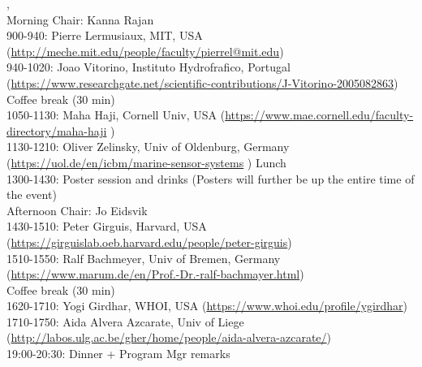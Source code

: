 \newpage
{}

\vspace{3mm}

, \\
Morning Chair: Kanna Rajan\\
900-940: Pierre Lermusiaux, MIT, USA (\url{http://meche.mit.edu/people/faculty/pierrel@mit.edu})\\
940-1020: Joao Vitorino, Instituto Hydrofrafico, Portugal (\url{https://www.researchgate.net/scientific-contributions/J-Vitorino-2005082863})\\
Coffee break (30 min)\\
1050-1130: Maha Haji, Cornell Univ, USA (\url{https://www.mae.cornell.edu/faculty-directory/maha-haji} )\\
1130-1210: Oliver Zelinsky, Univ of Oldenburg, Germany (\url{https://uol.de/en/icbm/marine-sensor-systems} )
Lunch \\
1300-1430: Poster session and drinks (Posters will further be up the entire time of the event) \\
Afternoon Chair: Jo Eidsvik \\
1430-1510: Peter Girguis, Harvard, USA (\url{https://girguislab.oeb.harvard.edu/people/peter-girguis}) \\
1510-1550: Ralf Bachmeyer, Univ of Bremen, Germany (\url{https://www.marum.de/en/Prof.-Dr.-ralf-bachmayer.html})\\
Coffee break (30 min)\\
1620-1710: Yogi Girdhar, WHOI, USA (\url{https://www.whoi.edu/profile/ygirdhar}) \\
1710-1750: Aida Alvera Azcarate, Univ of Liege (\url{http://labos.ulg.ac.be/gher/home/people/aida-alvera-azcarate/})\\
19:00-20:30: Dinner + Program Mgr remarks

\vspace{5mm}

